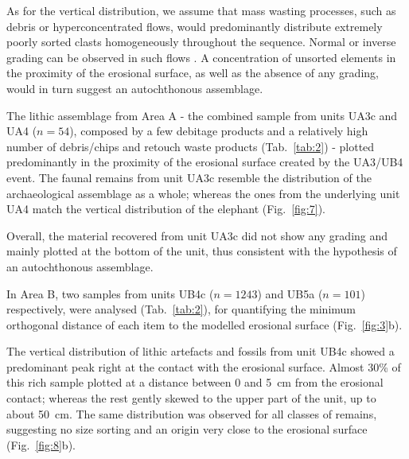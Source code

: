 \documentclass[review,authoryear,times]{elsarticle} %
\begin{document}

As for the vertical distribution, we assume that mass wasting processes, such as debris or hyperconcentrated flows, would predominantly distribute extremely poorly sorted clasts homogeneously throughout the sequence. Normal or inverse grading can be observed in such flows \citep{Pierson2005}. A concentration of unsorted elements in the proximity of the erosional surface, as well as the absence of any grading, would in turn suggest an autochthonous assemblage.


The lithic assemblage from Area A - the combined sample from units UA3c and UA4 ($n = 54$), composed by a few debitage products and a relatively high number of debris/chips and retouch waste products (Tab.~\ref{tab:2}) - plotted predominantly in the proximity of the erosional surface created by the UA3/UB4 event. The faunal remains from unit UA3c resemble the distribution of the archaeological assemblage as a whole; whereas the ones from the underlying unit UA4 match the vertical distribution of the elephant (Fig.~\ref{fig:7}).

Overall, the material recovered from unit UA3c did not show any grading and mainly plotted at the bottom of the unit, thus consistent with the hypothesis of an autochthonous assemblage.


In Area B, two samples from units UB4c ($n = 1243$) and UB5a ($n = 101$) respectively, were analysed (Tab.~\ref{tab:2}), for quantifying the minimum orthogonal distance of each item to the modelled erosional surface (Fig.~\ref{fig:3}b).

The vertical distribution of lithic artefacts and fossils from unit UB4c showed a predominant peak right at the contact with the erosional surface. Almost 30\% of this rich sample plotted at a distance between 0 and 5~cm from the erosional contact; whereas the rest gently skewed to the upper part of the unit, up to about 50~cm. The same distribution was observed for all classes of remains, suggesting no size sorting and an origin very close to the erosional surface (Fig.~\ref{fig:8}b).
\end{document}
